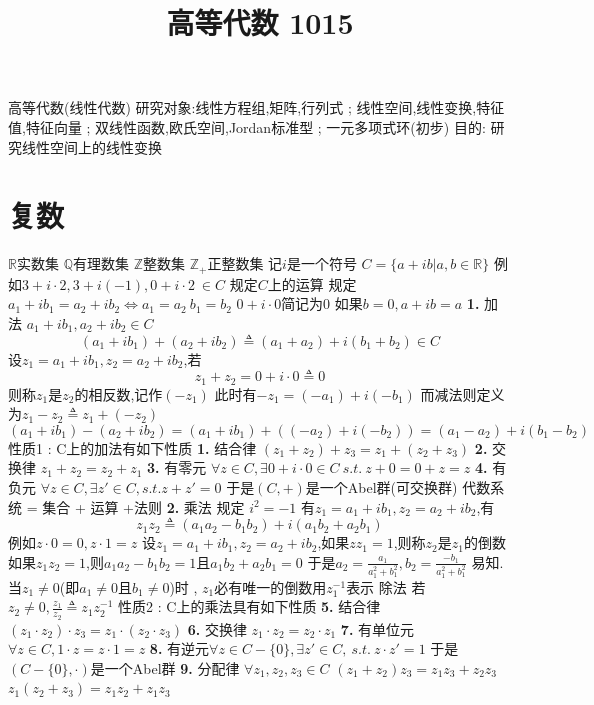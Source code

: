 \documentclass[UTF8,11pt]{ctexart}
\title{高等代数 1015}
\date{}
\theoremstyle{cnthm}
\begin{document}
\maketitle

高等代数(线性代数)
研究对象:线性方程组,矩阵,行列式 ; 线性空间,线性变换,特征值,特征向量 ; 双线性函数,欧氏空间,Jordan标准型 ; 一元多项式环(初步)
目的: 研究线性空间上的线性变换

\section{复数}

$\mathbb{R}$实数集 $\mathbb{Q}$有理数集 $\mathbb{Z}$整数集 $\mathbb{Z_+}$正整数集
记$i$是一个符号
$C = \{ a+ib | a,b \in \mathbb{R} \}$
例如$3+i \cdot 2,3 + i(-1),0+i \cdot 2 \ \in C$
规定$C$上的运算
规定$a_1 +ib_1 = a_2 + ib_2 \Leftrightarrow a_1 = a_2 \ b_1 = b_2$
$0 + i \cdot 0$简记为0 
如果$b = 0 , a+ib = a$
\noindent\textbf{1.} 加法 $a_1+ib_1 , a_2+ib_2 \in C$
\[
	(a_1 + i b_1) + (a_2 + i b_2) \triangleq (a_1+a_2) + i(b_1+b_2) \in C
\]
	设$z_1 = a_1+ib_1 ,z_2 =  a_2+ib_2$,若
\[
	z_1+z_2 = 0 +i \cdot 0 \triangleq 0
\]
	则称$z_1$是$z_2$的相反数,记作$(-z_1)$
	此时有$-z_1 = (-a_1) +i(-b_1)$
	而减法则定义为$z_1-z_2 \triangleq z_1 + (-z_2)$
\[
	(a_1+ib_1)-(a_2+ib_2) = (a_1+ib_1)+((-a_2)+i(-b_2)) = (a_1-a_2)+i(b_1-b_2)
\]
	性质1 : C上的加法有如下性质
\noindent\textbf{1.} 结合律 $(z_1+z_2)+z_3 = z_1 + (z_2+z_3)$
\noindent\textbf{2.} 交换律 $z_1+z_2 = z_2+z_1$
\noindent\textbf{3.} 有零元 $\forall z \in C , \exists 0 + i \cdot 0 \in C \ s.t. \ z+0=0+z=z$
\noindent\textbf{4.} 有负元 $\forall z \in C , \exists z' \in C , s.t. z+z' = 0$
	于是$(C,+)$是一个Abel群(可交换群)
	代数系统 = 集合 + 运算 +法则
\noindent\textbf{2.} 乘法 规定 $i^2 = -1$
	有$z_1 = a_1 + ib_1 , z_2 = a_2 +ib_2$,有
\[
	z_1z_2 \triangleq (a_1a_2-b_1b_2)+i(a_1b_2+a_2b_1)
\]
	例如$z \cdot 0 = 0 , z \cdot 1 = z$
	设$z_1 = a_1 + ib_1 , z_2 = a_2 +ib_2$,如果$zz_1 = 1$,则称$z_2$是$z_1$的倒数
	如果$z_1z_2 = 1$,则$a_1a_2-b_1b_2 = 1$且$a_1b_2+a_2b_1 = 0$
	于是$a_2 = \frac{a_1}{a_1^2+b_1^2} , b_2 = \frac{-b_1}{a_1^2+b_1^2}$
	易知.当$z_1 \neq 0$(即$a_1 \neq 0$且$b_1 \neq 0$)时 , $z_1$必有唯一的倒数用$z_1^{-1}$表示
	除法 若$z_2 \neq 0 , \frac{z_1}{z_2} \triangleq z_1z_2^{-1}$
	性质2 : C上的乘法具有如下性质
\noindent\textbf{5.} 结合律 $(z_1 \cdot z_2) \cdot z_3 = z_1 \cdot (z_2 \cdot z_3)$
\noindent\textbf{6.} 交换律 $z_1 \cdot z_2 = z_2 \cdot z_1$
\noindent\textbf{7.} 有单位元$ \forall z \in C , 1 \cdot z = z \cdot 1 = z$
\noindent\textbf{8.} 有逆元$ \forall z \in C -\{0\} , \exists z' \in C , \ s.t. \ z \cdot z' = 1$
	于是$(C -\{ 0 \} , \cdot)$是一个Abel群
\noindent\textbf{9.} 分配律 $\forall z_1 , z_2 , z_3 \in C$ 
	$(z_1+z_2)z_3 = z_1z_3+z_2z_3$
	$z_1(z_2+z_3) = z_1z_2+z_1z_3$
	
\end{document}
